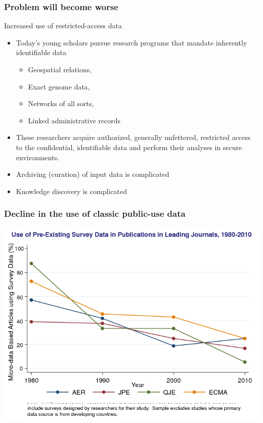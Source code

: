 \begin{frame}
\frametitle{Problem will become worse}
\begin{block}{Increased use of restricted-access data}
\begin{itemize}
\item Today's young scholars pursue research
programs that mandate inherently identifiable data
\begin{itemize}
\item Geospatial relations,
\item Exact genome data,
\item Networks of all sorts,
\item Linked administrative records
\end{itemize}
\item These researchers acquire authorized, generally unfettered, restricted access to the
confidential, identifiable data and perform their analyses in secure
environments.
\item Archiving (curation) of input data is complicated
\item Knowledge discovery is complicated
\end{itemize}
\end{block}
\end{frame}
\begin{frame}
\frametitle{Decline in the use of classic public-use data}
%
\includegraphics[width=0.8\paperwidth]{ChettySlide1}
\end{frame}

